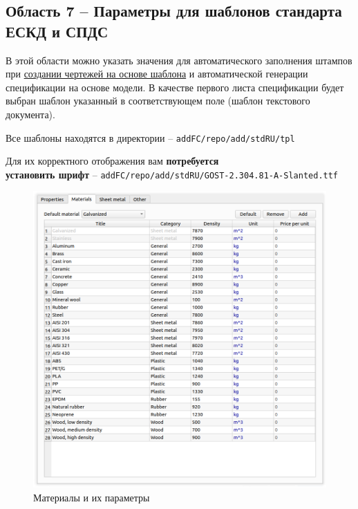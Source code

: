 \documentclass[a4paper,12pt]{article}
\begin{document}
\subsection{Область 7 -- Параметры для шаблонов стандарта ЕСКД и СПДС}
В этой области можно указать значения для автоматического заполнения штампов при \hyperref[sec:6]{создании чертежей на основе шаблона} и автоматической генерации спецификации на основе модели. В качестве первого листа спецификации будет выбран шаблон указанный в соответствующем поле (шаблон текстового документа).

Все шаблоны находятся в директории -- \verb|addFC/repo/add/stdRU/tpl|

Для их корректного отображения вам \textbf{потребуется\\установить шрифт} -- \verb|addFC/repo/add/stdRU/GOST-2.304.81-A-Slanted.ttf|\\

\pagebreak


\begin{figure}[htp]
	\centering
	\includegraphics[width=1\textwidth]{img/pref_materials.png}
	\caption{Материалы и их параметры}
	\label{sec:pref_materials}
\end{figure}
\end{document}
